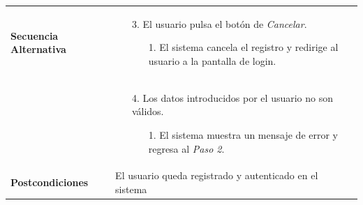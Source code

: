 \begin{longtable}{| p{4cm} | p{10cm} |}
\hline
\textbf{Secuencia Alternativa} &\mbox{}\par\vspace{-\baselineskip}
\begin{enumerate}[leftmargin=0.7cm, topsep=0.1cm]
\item[3.] El usuario pulsa el botón de \textit{Cancelar}.
	\begin{itemize}
	\item[1.] El sistema cancela el registro y redirige al usuario a la pantalla de login.
	\end{itemize}
\end{enumerate}
\\ &\mbox{}\par\vspace{-\baselineskip}
\begin{enumerate}[leftmargin=0.7cm, topsep=-1cm]
\item[4.] Los datos introducidos por el usuario no son válidos.
	\begin{itemize}
	\item[1.] El sistema muestra un mensaje de error y regresa al \textit{Paso 2}.
	\end{itemize}
\end{enumerate}\\

\hline
\textbf{Postcondiciones} & 
El usuario queda registrado y autenticado en el sistema\\
\hline
\end{longtable}




\newpage
